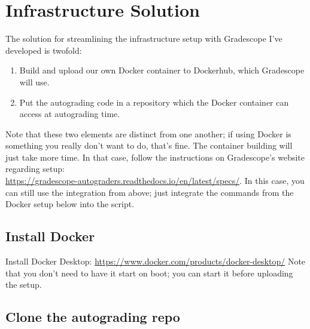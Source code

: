 \documentclass[11pt]{report}
\begin{document}
\chapter*{Infrastructure Solution}
The solution for streamlining the infrastructure setup with Gradescope I've developed is twofold:
\begin{enumerate}
      \item Build and upload our own Docker container to Dockerhub, which Gradescope will use.
      \item Put the autograding code in a  repository which the Docker container can access at autograding time. 
\end{enumerate}
Note that these two elements are distinct from one another; if using Docker is something you really don't want to do, that's fine. The container building 
will just take more time. In that case, follow the instructions on Gradescope's website regarding 
setup:\\ \textcolor{blue}{\href{https://gradescope-autograders.readthedocs.io/en/latest/specs/}{https://gradescope-autograders.readthedocs.io/en/latest/specs/}}.
In this case, you can still use the  integration from above; just integrate the  commands 
from the Docker setup below into the  script. 

\section*{Install Docker}
Install Docker Desktop: \textcolor{blue}{\href{https://www.docker.com/products/docker-desktop/}{https://www.docker.com/products/docker-desktop/}}
Note that you don't need to have it start on boot; you can start it before uploading the setup. 

\section*{Clone the autograding repo}
\end{document}
